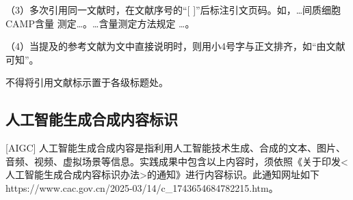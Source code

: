 （3）多次引用同一文献时，在文献序号的“[ ]”后标注引文页码。如，…间质细胞CAMP含量
测定\cite[100-197]{cnarticle}…。…含量测定方法规定
\cite[92]{cnarticle}…。

（4）当提及的参考文献为文中直接说明时，则用小4号字与正文排齐，如“由文献可知”。

不得将引用文献标示置于各级标题处。


\subsection{人工智能生成合成内容标识}[AIGC]
人工智能生成合成内容是指利用人工智能技术生成、合成的文本、图片、音频、视频、虚拟场景等信息。实践成果中包含以上内容时，须依照《关于印发<人工智能生成合成内容标识办法>的通知》进行内容标识。此通知网址如下https://www.cac.gov.cn/2025-03/14/c\_1743654684782215.htm。






